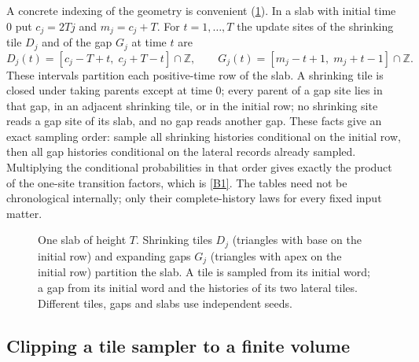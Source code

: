 \documentclass[11pt]{article}
\theoremstyle{plain}
\theoremstyle{definition}
\theoremstyle{remark}
\newcommand{\Z}{\mathbb{Z}}
\begin{document}
A concrete indexing of the geometry is convenient (\cref{fig:tiles}). In a slab with initial time $0$ put $c_j=2Tj$ and $m_j=c_j+T$. For $t=1,\dots,T$ the update sites of the shrinking tile $D_j$ and of the gap $G_j$ at time $t$ are
\begin{equation}
D_j(t)=[c_j-T+t,\;c_j+T-t]\cap\Z,\qquad G_j(t)=[m_j-t+1,\;m_j+t-1]\cap\Z.
\label{eq:tiles}
\end{equation}
These intervals partition each positive-time row of the slab. A shrinking tile is closed under taking parents except at time $0$; every parent of a gap site lies in that gap, in an adjacent shrinking tile, or in the initial row; no shrinking site reads a gap site of its slab, and no gap reads another gap. These facts give an exact sampling order: sample all shrinking histories conditional on the initial row, then all gap histories conditional on the lateral records already sampled. Multiplying the conditional probabilities in that order gives exactly the product of the one-site transition factors, which is \ref{B1}. The tables need not be chronological internally; only their complete-history laws for every fixed input matter.

\begin{figure}[t]
\centering
{}
\caption{One slab of height $T$. Shrinking tiles $D_j$ (triangles with base on the initial row) and expanding gaps $G_j$ (triangles with apex on the initial row) partition the slab. A tile is sampled from its initial word; a gap from its initial word and the histories of its two lateral tiles. Different tiles, gaps and slabs use independent seeds.}
\label{fig:tiles}
\end{figure}

\subsection{Clipping a tile sampler to a finite volume}
\end{document}
